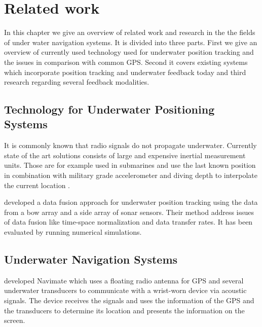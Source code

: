 %

\chapter{Related work}
\label{relatedwork}
In this chapter we give an overview of related work and research in the the fields of under water navigation systems. 
It is divided into three parts.
First we give an overview of currently used technology used for underwater position tracking and the issues in comparison with common GPS.
Second it covers existing systems which incorporate position tracking and underwater feedback today and third research regarding several feedback modalities. 

\section{Technology for Underwater Positioning Systems}

It is commonly known that radio signals do not propagate underwater.
Currently state of the art solutions consists of large and expensive inertial measurement units. 
Those are for example used in submarines and use the last known position in combination with military grade accelerometer and diving depth to interpolate the current location \citep{meyer}.

\cite{li} developed a data fusion approach for underwater position tracking using the data from a bow array and a side array of sonar sensors.
Their method address issues of data fusion like time-space normalization and data transfer rates.
It has been evaluated by running numerical simulations.

\section{Underwater Navigation Systems}

\cite{mckenzie} developed Navimate which uses a floating radio antenna for GPS and several underwater transducers to communicate with a wrist-worn device via acoustic signals. 
The device receives the signals and uses the information of the GPS and the transducers to determine its location and presents the information on the screen. 

